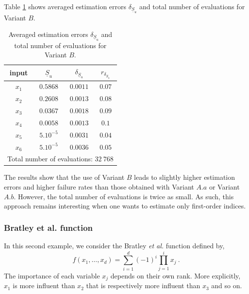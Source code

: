 Table \ref{res.gfunc.B} shows averaged estimation errors $\delta_{\underline{S}_u}$ and total number of evaluations for Variant $B$. 
\begin{table}[!ht]
\caption{Averaged estimation errors $\delta_{\underline{S}_u}$ and total number of evaluations for Variant $B$.}
\centering
\begin{tabular}{cccc}
\hline
 input & $\underline{S}_u$ & $\delta_{\underline{S}_u}$ & $r_{\delta_{\underline{S}_u}}$ \\ \hline
 $x_1$ & $0.5868$ &  $0.0011$ & $0.07$ \\ \hline
 $x_2$ & $0.2608$ &  $0.0013$ & $0.08$ \\ \hline
 $x_3$ & $0.0367$ &  $0.0018$ & $0.09$ \\ \hline
 $x_4$ & $0.0058$ &  $0.0013$ & $0.1$    \\ \hline
 $x_5$ & $5.10^{-5}$ & $0.0031$ & $0.04$  \\ \hline
 $x_6$ & $5.10^{-5}$ & $0.0036$ & $0.05$  \\ \hline \hline
\multicolumn{4}{l}{Total number of evaluations: $32 \ 768$}\\ \hline 
\end{tabular}
\label{res.gfunc.B}
\end{table}
The results show that the use of Variant $B$ leads to slightly higher estimation errors and higher failure rates than those obtained with Variant $A.a$ or Variant $A.b$. However, the total number of evaluations is twice as small. As such, this approach remains interesting when one wants to estimate only first-order indices.

\subsubsection{Bratley et al. function}

In this second example, we consider the Bratley \textit{et al.} function defined by,
$$f(x_1,\dots,x_d)=\sum \limits_{i=1}^{d} (-1)^i \prod \limits_{j=1}^{i} x_j \ .$$
The importance of each variable $x_j$ depends on their own rank. More explicitly, $x_1$ is more influent than $x_2$ that is respectively more influent than $x_3$ and so on. 

